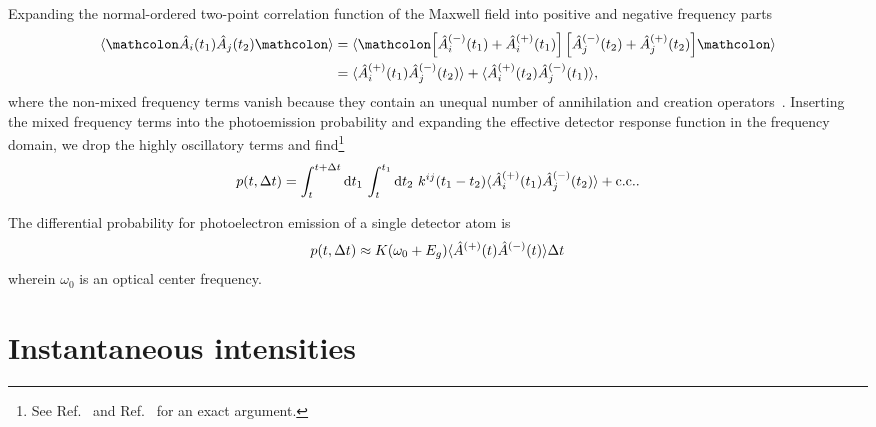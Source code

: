 Expanding the normal-ordered two-point correlation function of the Maxwell field into positive and negative frequency parts
\begin{equation}
	\begin{split}
		\expval{
			\norder{
				\hat{A}_i(t_1)
				\hat{A}_j(t_2)
			}
		}
		&=
		\expval{
			\norder{
				\left[
					\hat{A}_i^{(-)}(t_1)
					+
					\hat{A}_i^{(+)}(t_1)
				\right]
				\left[
					\hat{A}_j^{(-)}(t_2)
					+
					\hat{A}_j^{(+)}(t_2)
				\right]
			}
		}
		\\
		&=
		\expval{
			\hat{A}_i^{(+)}(t_1)
			\hat{A}_j^{(-)}(t_2)
		}
		+
		\expval{
			\hat{A}_i^{(+)}(t_2)
			\hat{A}_j^{(-)}(t_1)
		}
		,
	\end{split}
\end{equation}
where the non-mixed frequency terms vanish because they contain an unequal number of annihilation and creation operators~\cite[p.~134]{Cohen1992}.
Inserting the mixed frequency terms into the photoemission probability and expanding the effective detector response function in the frequency domain, we drop the highly oscillatory terms and find\footnote{See Ref.~\cite[p.~697]{Mandel1995} and Ref.~\cite[p.~136]{Cohen1992} for an exact argument.}
\begin{equation}
	p(t,\Delta t)
	=
	\int_t^{t+\Delta t}\dd{t_1}
	\int_t^{t_1}
	\dd{t_2}
	k^{ij}(t_1-t_2)
	\expval{
		\hat{A}_i^{(+)}(t_1)
		\hat{A}_j^{(-)}(t_2)
	}
	+
	\text{c.c.}
	.
\end{equation}

The differential probability for photoelectron emission of a single detector atom is~\cite{Kimble1984}
\begin{equation}
	p(t,\Delta t)
	\approx
	K(\omega_0+E_g)
	\langle
		\hat{A}^{(+)}(t)
		\hat{A}^{(-)}(t)
	\rangle
	\Delta t
	\label{eq:differential_photoemission_probability}
\end{equation}
wherein $\omega_0$ is an optical center frequency.

\section{Instantaneous intensities}


